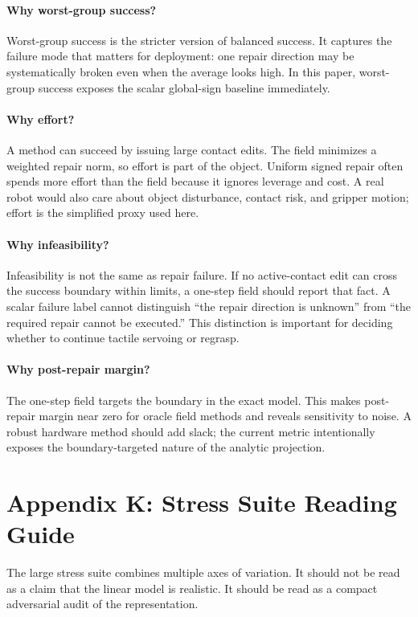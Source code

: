 \documentclass{article}
\begin{document}
\paragraph{Why worst-group success?}
Worst-group success is the stricter version of balanced success. It captures the failure mode that matters for deployment: one repair direction may be systematically broken even when the average looks high. In this paper, worst-group success exposes the scalar global-sign baseline immediately.

\paragraph{Why effort?}
A method can succeed by issuing large contact edits. The field minimizes a weighted repair norm, so effort is part of the object. Uniform signed repair often spends more effort than the field because it ignores leverage and cost. A real robot would also care about object disturbance, contact risk, and gripper motion; effort is the simplified proxy used here.

\paragraph{Why infeasibility?}
Infeasibility is not the same as repair failure. If no active-contact edit can cross the success boundary within limits, a one-step field should report that fact. A scalar failure label cannot distinguish ``the repair direction is unknown'' from ``the required repair cannot be executed.'' This distinction is important for deciding whether to continue tactile servoing or regrasp.

\paragraph{Why post-repair margin?}
The one-step field targets the boundary in the exact model. This makes post-repair margin near zero for oracle field methods and reveals sensitivity to noise. A robust hardware method should add slack; the current metric intentionally exposes the boundary-targeted nature of the analytic projection.

\clearpage
\section{Appendix K: Stress Suite Reading Guide}

The large stress suite combines multiple axes of variation. It should not be read as a claim that the linear model is realistic. It should be read as a compact adversarial audit of the representation.
\end{document}
